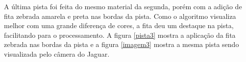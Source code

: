 	\begin{figure}[H]
		\centering
\end{figure}

A última pista foi feita do mesmo material da segunda, porém com a adição de fita zebrada amarela e preta nas bordas da pista. Como o algoritmo visualiza melhor com uma grande diferença de cores, a fita deu um destaque na pista, facilitando para o processamento. A figura \ref{pista3} mostra a aplicação da fita zebrada nas bordas da pista e a figura \ref{imagem3} mostra a mesma pista sendo visualizada pelo câmera do Jaguar.

	\begin{figure}[H]
		\centering
\end{figure}

